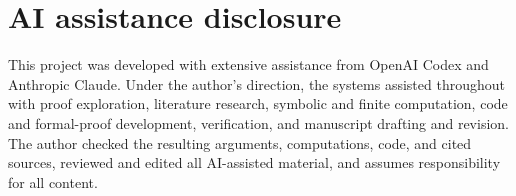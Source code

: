 \documentclass[11pt]{article}
\theoremstyle{definition}
\begin{document}










\section*{AI assistance disclosure}

This project was developed with extensive assistance from OpenAI Codex and
Anthropic Claude. Under the author's direction, the systems assisted
throughout with proof exploration, literature research, symbolic and finite
computation, code and formal-proof development, verification, and manuscript
drafting and revision. The author checked the resulting arguments,
computations, code, and cited sources, reviewed and edited all AI-assisted
material, and assumes responsibility for all content.

\footnotesize


\end{document}
